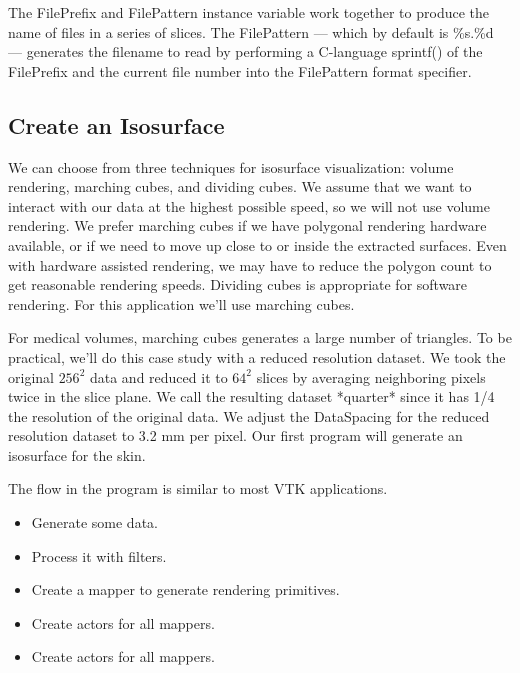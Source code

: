 The FilePrefix and FilePattern instance variable work together to produce the name of files in a series of slices. The FilePattern --- which by default is \%s.\%d --- generates the filename to read by performing a C-language sprintf() of the FilePrefix and the current file number into the FilePattern format specifier.

\subsection{Create an Isosurface}

We can choose from three techniques for isosurface visualization: volume rendering, marching cubes, and dividing cubes. We assume that we want to interact with our data at the highest possible speed, so we will not use volume rendering. We prefer marching cubes if we have polygonal rendering hardware available, or if we need to move up close to or inside the extracted surfaces. Even with hardware assisted rendering, we may have to reduce the polygon count to get reasonable rendering speeds. Dividing cubes is appropriate for software rendering. For this application we'll use marching cubes.

For medical volumes, marching cubes generates a large number of triangles. To be practical,  we'll do this case study with a reduced resolution dataset. We took the original $256^2$ data and reduced it to $64^2$ slices by averaging neighboring pixels twice in the slice plane. We call the resulting dataset *quarter* since it has 1/4 the resolution of the original data. We adjust the DataSpacing for the reduced resolution dataset to 3.2 mm per pixel. Our first program will generate an isosurface for the skin.

The flow in the program is similar to most VTK applications.

\begin{itemize}

	\item Generate some data.

	\item Process it with filters.

	\item Create a mapper to generate rendering primitives.

	\item Create actors for all mappers.

	\item Create actors for all mappers.

\end{itemize}

